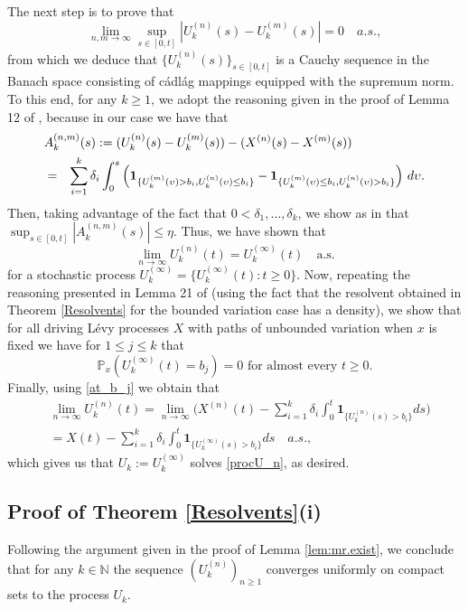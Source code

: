 \documentclass[12pt,reqno]{amsart}
\theoremstyle{definition}
\theoremstyle{remark}
\newcommand{\ind}{\mathbf{1}}
\begin{document}
	The next step is to prove that
		\begin{equation}\label{convergence_U_k}
		\lim_{n,m\to\infty}\sup_{s\in[0,t]}|U_k^{(n)}(s)-U_k^{(m)}(s)|=0 \quad a.s.,
		\end{equation}
		from which we deduce that $\{U_k^{(n)}(s)\}_{s\in[0,t]}$ is a Cauchy sequence in the Banach space consisting of c\'adl\'ag mappings 
		equipped with the supremum norm.
To this end, for any $k\geq 1$, we adopt the reasoning given in the proof of Lemma 12 of \cite{kyprianouloeffen2010}, because in our case we have that
\begin{eqnarray*}
	\lefteqn{	A^{(n,m)}_k(s):= (U_k^{(n)}(s) - U_k^{(m)}(s))-(X^{(n)}(s)-X^{(m)}(s))}\\
	&=&\sum_{i=1}^k\delta_i \int_0^s \left(\ind_{\{U_k^{(m)}(\upsilon)>b_i, U_k^{(n)}(\upsilon)\leq b_i\}}-
		\ind_{\{U_k^{(m)}(\upsilon)\leq b_i, U_k^{(n)}(\upsilon)>b_i\}} \right) \, d\upsilon.
		\end{eqnarray*}
		Then, taking  advantage of the fact that $0<\delta_1,...,\delta_k$, we show as in \cite{kyprianouloeffen2010} that \\
		$\sup_{s \in [0,t]} |A^{(n,m)}_k(s)| \leq \eta$. Thus, we have shown that 
		$$\lim_{n \rightarrow \infty}U_k^{(n)}(t)=U_k^{(\infty)}(t) \quad \textrm {a.s.}$$
		for a stochastic process $U_k^{(\infty)}=\{U_k^{(\infty)}(t): t\geq 0\}$.
		Now, repeating the reasoning presented in Lemma 21 of \cite{kyprianouloeffen2010} 
		(using the fact that the resolvent obtained in Theorem \ref{Resolvents} for the bounded variation case has a density), 
		we show that for all driving L\'evy processes $X$ with paths of unbounded variation when $x$ is fixed we have for $1\leq j \leq k$ that 
\begin{equation}\label{at_b_j}
\mathbb{P}_x(U_k^{(\infty)}(t)= b_j) = 0 \textrm{ for almost every $t \geq  0$}.
\end{equation}
Finally, using \eqref{at_b_j} we obtain that 
\begin{align*}
			&\lim_{n \rightarrow \infty}U_k^{(n)}(t)=\lim_{n \rightarrow \infty}\Big(X^{(n)}(t)-\sum_{i=1}^k\delta_i \int_0^t 
			\ind_{\{U_k^{(n)}(s)>b_i\}}ds \Big) \\&  = X(t)-\sum_{i=1}^k\delta_i \int_0^t \ind_{\{U^{(\infty)}_k(s)>b_i\}}ds \quad a.s.,
		\end{align*}
which gives us that $U_k:=U_k^{(\infty)}$ solves \eqref{procU_n}, as desired.			
			  
				
\subsection{Proof of Theorem \ref{Resolvents}(i) }
Following the argument given in the proof of Lemma \ref{lem:mr.exist}, we conclude that for any $k\in\mathbb{N}$ the sequence $(U^{(n)}_k)_{n\geq 1}$ 
converges uniformly on compact sets to the process $U_k$.
\end{document}

